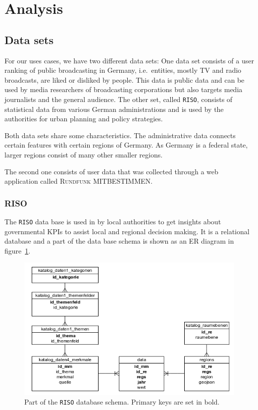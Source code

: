 \documentclass{article}
\newcommand{\rufu}{\textsc{Rundfunk MITBESTIMMEN}}
\newcommand{\riso}{\texttt{RISO}}
\begin{document}
\clearpage
\section{Analysis}\label{sec:analysis}



\subsection{Data sets}
For our uses cases, we have two different data sets:
One data set consists of a user ranking of public broadcasting in Germany, i.e.\ entities, mostly TV and radio broadcasts, are liked or disliked by people.
This data is public data and can be used by media researchers of broadcasting corporations but also targets media journalists and the general audience.
The other set, called \riso{}, consists of statistical data from various German administrations and is used by the authorities for urban planning and policy strategies.

Both data sets share some characteristics.
The administrative data connects certain features with certain regions of Germany.
As Germany is a federal state, larger regions consist of many other smaller regions.

The second one consists of user data that was collected through a web application called \rufu{}.

\subsubsection{RISO}

The \riso{} data base is used in by local authorities to get insights about governmental KPIs to assist local and regional decision making.
It is a relational database and a part of the data base schema is shown as an ER diagram in figure~\ref{fig:data:riso}.

\begin{figure}[h!]
  \centering
  \includegraphics[width=\textwidth]{images/riso}
  \caption{Part of the \riso{} database schema. Primary keys are set in bold.}
  \label{fig:data:riso}
\end{figure}
\end{document}
